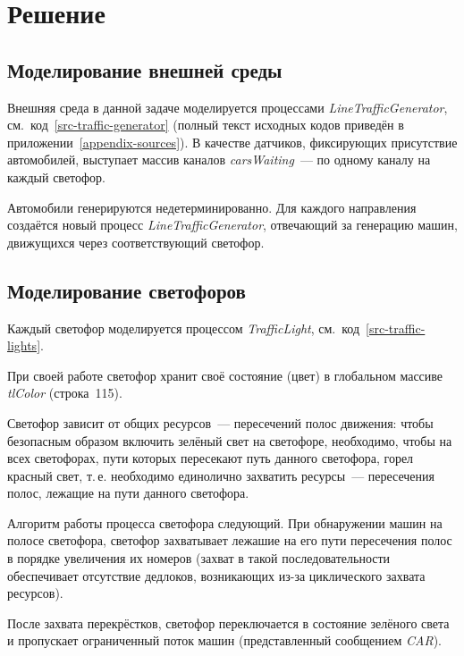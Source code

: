 \documentclass[a4paper,10pt]{article}
\begin{document}
\section{Решение}

\subsection{Моделирование внешней среды}
Внешняя среда в данной задаче моделируется процессами \textit{LineTrafficGenerator}, 
см.~код~\ref{src-traffic-generator} (полный текст исходных кодов приведён в приложении~\ref{appendix-sources}).
В качестве датчиков, фиксирующих присутствие автомобилей, 
выступает массив каналов \textit{carsWaiting}~--- по одному каналу на каждый светофор.

Автомобили генерируются недетерминированно. 
Для каждого направления создаётся новый процесс \textit{LineTrafficGenerator},
отвечающий за генерацию машин, движущихся через соответствующий светофор.



\subsection{Моделирование светофоров}
Каждый светофор моделируется процессом \textit{TrafficLight}, см.~код~\ref{src-traffic-lights}.

При своей работе светофор хранит своё состояние (цвет) в глобальном массиве \textit{tlColor} 
(строка~115).

Светофор зависит от общих ресурсов~--- пересечений полос движения: 
чтобы безопасным образом включить зелёный свет на светофоре, необходимо,
чтобы на всех светофорах, пути которых пересекают путь данного светофора,
горел красный свет, т.\,е. необходимо единолично захватить ресурсы~--- пересечения полос, 
лежащие на пути данного светофора.

Алгоритм работы процесса светофора следующий.
При обнаружении машин на полосе светофора, светофор захватывает лежашие на его пути
пересечения полос в порядке увеличения их номеров 
(захват в такой последовательности обеспечивает отсутствие дедлоков, 
возникающих из-за циклического захвата ресурсов).

После захвата перекрёстков, светофор переключается в состояние зелёного света и пропускает ограниченный поток машин
(представленный сообщением \textit{CAR}).
\end{document}
